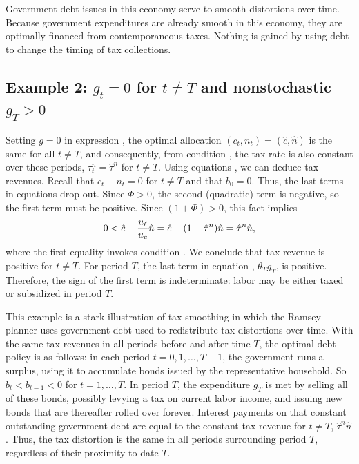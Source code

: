 Government debt issues in this economy  serve to smooth
distortions over time. Because government expenditures are already smooth
in this economy, they are optimally financed from contemporaneous
taxes. Nothing is gained by using debt to change the timing of tax
collections.


\subsection{Example 2: $g_t=0$ for $t\not= T$ and nonstochastic $g_T>0$}
\label{sec:LucasStokey_ex2}%
Setting $g=0$ in expression , the optimal
allocation  $(c_t,n_t)=(\hat c, \hat n)$ is the same  for all $t\not= T$,
and consequently, from condition , the tax rate is also constant
over these periods, $\tau^n_t=\hat \tau^n$ for $t\not= T$. Using
equations , we can deduce tax revenues.
Recall that $c_t-n_t=0$ for $t\neq T$  and that $b_0=0$. Thus, the
last terms in equations 
drop out. Since $\Phi>0$, the second (quadratic) term is negative, so
the first term must be positive. Since $(1+\Phi)>0$, this fact implies
$$
0<\hat c - {u_{\ell} \over u_c} \hat n = \hat c - (1-\hat \tau^n) \hat n
 = \hat \tau^n \hat n,
$$
where the first equality invokes condition . We conclude that
tax revenue is positive for $t\not= T$. For period $T$, the last term
in equation , $\theta_T g_T$, is positive. Therefore, the sign
of the first term is indeterminate: labor may be either taxed or
subsidized in period $T$.

This example is a stark illustration of tax smoothing in which the Ramsey planner uses government  debt
used to redistribute tax distortions over time. With the same tax
revenues in all periods before and after time $T$, the optimal debt
policy is as follows: in each period $t=0,1, \ldots ,T-1$, the government
runs a surplus, using it to accumulate  bonds issued by the representative household.
So $b_t < b_{t-1} < 0$ for $t = 1, \ldots , T$.
In period $T$, the expenditure $g_T$ is met by selling all of these
bonds, possibly levying a tax on current labor income, and issuing
new bonds that are thereafter rolled over forever. Interest payments
on that constant outstanding government debt are equal to the constant
tax revenue for $t\not= T$,
$\hat \tau^n \hat n$. Thus, the tax distortion is the same in all periods
surrounding period $T$, regardless of their proximity to  date $T$. %

